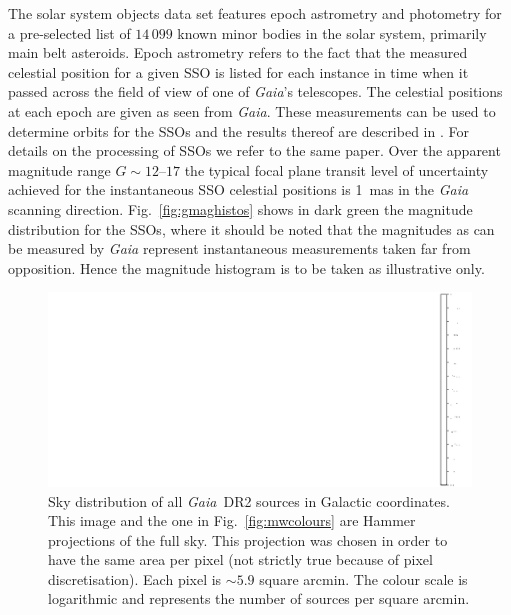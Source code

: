 \documentclass[longauth]{aa_gaia} %
\newcommand\gaia{\textit{Gaia}}
\newcommand\gdr[1]{\gaia~DR#1}
\newcommand\figref[1]{Fig.~\ref{#1}}
\newcommand\gdrtwossonum{\ensuremath{14\,099}}
\begin{document}
The solar system objects data set features epoch astrometry and photometry for a pre-selected list
of {\gdrtwossonum} known minor bodies in the solar system, primarily main belt asteroids. Epoch
astrometry refers to the fact that the measured celestial position for a given SSO is listed for
each instance in time when it passed across the field of view of one of {\gaia}'s telescopes. The
celestial positions at each epoch are given as seen from {\gaia}. These measurements can be used to
determine orbits for the SSOs and the results thereof are described in \cite{DR2-DPACP-32}. For
details on the processing of SSOs we refer to the same paper.  Over the apparent magnitude range
$G\sim12$--$17$ the typical focal plane transit level of uncertainty achieved for the instantaneous
SSO celestial positions is 1~mas in the {\gaia} scanning direction. \figref{fig:gmaghistos} shows in
dark green the magnitude distribution for the SSOs, where it should be noted that the magnitudes as
can be measured by {\gaia} represent instantaneous measurements taken far from opposition. Hence the
magnitude histogram is to be taken as illustrative only.

\begin{figure}[t]
  \includegraphics[width=\textwidth]{figures/GaiaDR2_sky_density_colorbar.png}
  \caption{Sky distribution of all \gdr{2} sources in Galactic coordinates. This image and the one
    in \figref{fig:mwcolours} are Hammer projections of the full sky. This projection was chosen in
    order to have the same area per pixel (not strictly true because of pixel discretisation). Each
    pixel is $\sim5.9$ square arcmin. The colour scale is logarithmic and represents the number of
  sources per square arcmin.\label{fig:sourcedensity}}
\end{figure}
\end{document}
